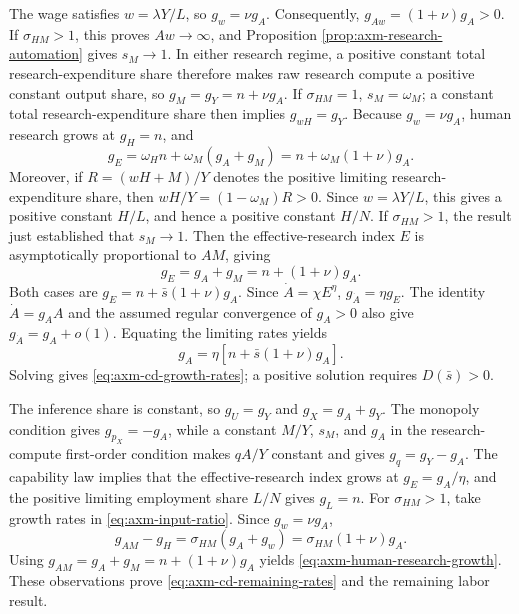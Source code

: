 The wage satisfies \(w=\lambda Y/L\), so \(g_w=\nu g_A\). Consequently,
\(g_{Aw}=(1+\nu)g_A>0\). If \(\sigma_{HM}>1\), this proves \(Aw\to\infty\),
and Proposition \ref{prop:axm-research-automation} gives \(s_M\to1\).
In either research regime, a positive constant total research-expenditure share
therefore makes raw research compute a positive constant output share, so
\(g_M=g_Y=n+\nu g_A\). If \(\sigma_{HM}=1\), \(s_M=\omega_M\); a constant total
research-expenditure share then implies \(g_{wH}=g_Y\). Because
\(g_w=\nu g_A\), human research grows at \(g_H=n\), and
\[
 g_E=\omega_H n+\omega_M(g_A+g_M)
 =n+\omega_M(1+\nu)g_A.
\]
Moreover, if \(R=(wH+M)/Y\) denotes the positive limiting research-expenditure
share, then \(wH/Y=(1-\omega_M)R>0\). Since \(w=\lambda Y/L\), this gives a
positive constant \(H/L\), and hence a positive constant \(H/N\).
If \(\sigma_{HM}>1\), the result just established that \(s_M\to1\). Then the
effective-research index \(E\) is asymptotically proportional
to \(AM\), giving
\[
 g_E=g_A+g_M=n+(1+\nu)g_A.
\]
Both cases are \(g_E=n+\bar s(1+\nu)g_A\). Since
\(\dot A=\chi E^\eta\), \(g_{\dot A}=\eta g_E\). The identity
\(\dot A=g_AA\) and the assumed regular convergence of \(g_A>0\) also give
\(g_{\dot A}=g_A+o(1)\). Equating the limiting rates yields
\[
 g_A=\eta[n+\bar s(1+\nu)g_A].
\]
Solving gives \eqref{eq:axm-cd-growth-rates}; a positive solution requires
\(D(\bar s)>0\).

The inference share is constant, so \(g_U=g_Y\) and
\(g_X=g_A+g_Y\). The monopoly condition gives \(g_{p_X}=-g_A\), while a
constant \(M/Y\), \(s_M\), and \(g_A\) in the research-compute first-order
condition makes \(qA/Y\) constant and gives \(g_q=g_Y-g_A\). The capability
law implies that the effective-research index grows at \(g_E=g_A/\eta\), and the positive
limiting employment share \(L/N\) gives
\(g_L=n\). For \(\sigma_{HM}>1\), take growth rates in
\eqref{eq:axm-input-ratio}. Since \(g_w=\nu g_A\),
\[
 g_{AM}-g_H=\sigma_{HM}(g_A+g_w)
 =\sigma_{HM}(1+\nu)g_A.
\]
Using \(g_{AM}=g_A+g_M=n+(1+\nu)g_A\) yields
\eqref{eq:axm-human-research-growth}. These observations prove
\eqref{eq:axm-cd-remaining-rates} and the remaining labor result.

